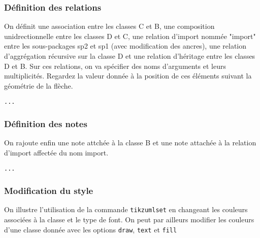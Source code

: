 \documentclass[a4paper,11pt]{report}
\newcommand{\inputTikZ}[1]{%
  }%
\newcommand{\inputTikZ}[1]{%
    \texttt{[image: fig/\#1.pdf]}%
  }%
\begin{document}
\begin{center}
\inputTikZ{figure33}
\end{center}


\subsubsection{Définition des relations}

On définit une association entre les classes C et B, une composition unidrectionnelle entre les classes D et C, une relation d'import nommée "import" entre les sous-packages sp2 et sp1 (avec modification des ancres), une relation d'aggrégation récursive sur la classe D et une relation d'héritage entre les classes D et B. Sur ces relations, on va spécifier des noms d'arguments et leurs multiplicités. Regardez la valeur donnée à la position de ces éléments suivant la géométrie de la flèche.

\medskip

\hspace{-0.7cm}\lstinline{...}
{\color{red!70!black}

}

\begin{center}
\inputTikZ{figure34}
\end{center}

\subsubsection{Définition des notes}

On rajoute enfin une note attchée à la classe B et une note attachée à la relation d'import affectée du nom import.

\medskip

\hspace{-0.7cm}\lstinline{...}
{\color{red!70!black}

}

\begin{center}
\inputTikZ{figure35}
\end{center}

\subsubsection{Modification du style}

On illustre l'utilisation de la commande {\tt tikzumlset} en changeant les couleurs associées à la classe et le type de font. On peut par ailleurs modifier les couleurs d'une classe donnée avec les options {\tt draw}, {\tt text} et {\tt fill}
\end{document}
